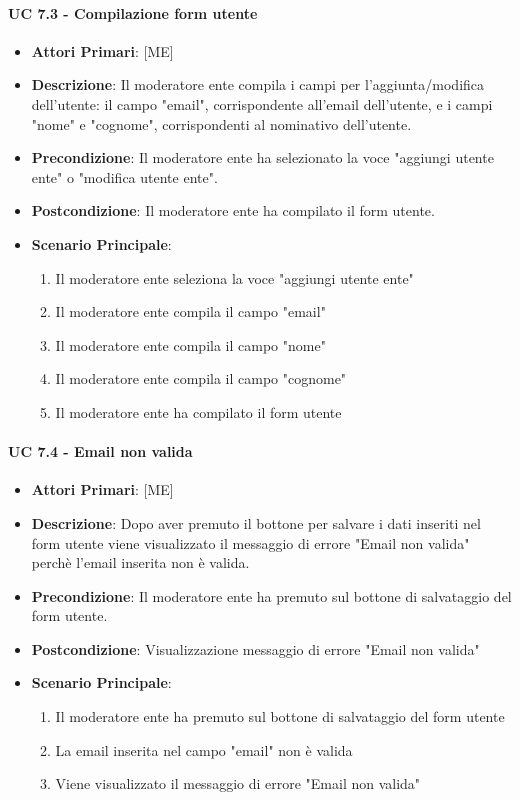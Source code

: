 			\paragraph{UC 7.3 - Compilazione form utente}
			\begin{itemize}
				\item \textbf{Attori Primari}: [ME]
				\item \textbf{Descrizione}: Il moderatore ente compila i campi per l'aggiunta/modifica dell'utente: il campo "email", corrispondente all'email dell'utente, e i campi "nome" e "cognome", corrispondenti al nominativo dell'utente.
				\item \textbf{Precondizione}: Il moderatore ente ha selezionato la voce "aggiungi utente ente" o "modifica utente ente".
				\item \textbf{Postcondizione}: Il moderatore ente ha compilato il form utente.
				\item \textbf{Scenario Principale}:
				\begin{enumerate}
					\item{Il moderatore ente seleziona la voce "aggiungi utente ente"}
					\item{Il moderatore ente compila il campo "email"}
					\item{Il moderatore ente compila il campo "nome"}
					\item{Il moderatore ente compila il campo "cognome"}
					\item{Il moderatore ente ha compilato il form utente}
				\end{enumerate}	
			\end{itemize}
			
			\paragraph{UC 7.4 - Email non valida}
			\begin{itemize}
				\item \textbf{Attori Primari}: [ME]
				\item \textbf{Descrizione}: Dopo aver premuto il bottone per salvare i dati inseriti nel form utente viene visualizzato il messaggio di errore "Email non valida" perchè l'email inserita non è valida. 
				\item \textbf{Precondizione}: Il moderatore ente ha premuto sul bottone di salvataggio del form utente.
				\item \textbf{Postcondizione}: Visualizzazione messaggio di errore "Email non valida"
				\item \textbf{Scenario Principale}:
				\begin{enumerate}
					\item{Il moderatore ente ha premuto sul bottone di salvataggio del form utente}
					\item{La email inserita nel campo "email" non è valida}
					\item{Viene visualizzato il messaggio di errore "Email non valida"}
				\end{enumerate}	
			\end{itemize}
			

